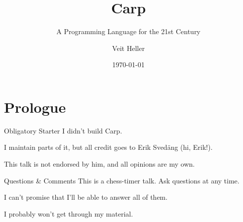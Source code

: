 \documentclass[14pt,aspectratio=169]{beamer}
\title{Carp}
\subtitle{A Programming Language for the 21st Century}
\date{\today}
\author{Veit Heller}
\institute{Port Zero}
\begin{document}
  \maketitle
  \section{Prologue}
  \begin{frame}{Obligatory Starter}
    I didn’t build Carp.
    \linebreak

    I maintain parts of it, but all credit goes to Erik Svedäng (hi, Erik!).
    \linebreak

    This talk is not endorsed by him, and all opinions are my own.
  \end{frame}
  \begin{frame}{Questions \& Comments}
    This is a chess-timer talk. Ask questions at any time.
    \linebreak

    I can’t promise that I’ll be able to answer all of them.
    \linebreak

    I probably won’t get through my material.
  \end{frame}
\end{document}

